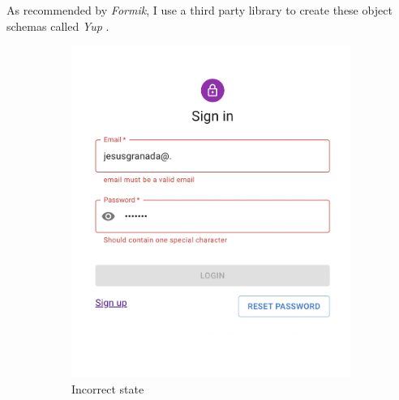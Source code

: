         As recommended by \textit{Formik}, I use a third party library to create these object schemas called \textit{Yup} \cite{Yup}.

        \begin{figure}[H]
            \centering
            \begin{subfigure}[T]{0.49\textwidth}
                \centering
                \includegraphics[width=\textwidth]{assets/form_incorrect.png}
                \caption{Incorrect state}
                \label{fig:impl_form_incorrect}
            \end{subfigure}
            \hfill
            \begin{subfigure}[T]{0.49\textwidth}
                \centering

\end{subfigure}
\end{figure}
